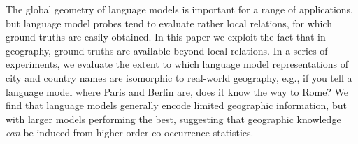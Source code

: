 The global geometry of language models is important for a range of applications, but language model probes tend to evaluate rather local relations, for which ground truths are easily obtained. In this paper we exploit the fact that in geography, ground truths are available beyond local relations. In a series of experiments, we evaluate the extent to which language model representations of city and country names are isomorphic to real-world geography, e.g., if you tell a language model where Paris and Berlin are, does it know the way to Rome? We find that language models generally encode limited geographic information, but with larger models performing the best, suggesting that geographic knowledge {\em can} be induced from higher-order co-occurrence statistics.
